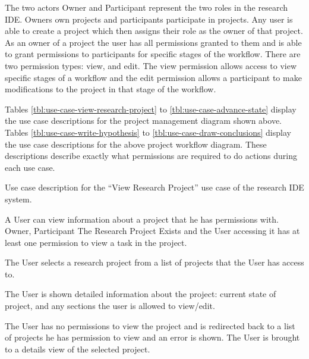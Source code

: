 \documentclass[document.tex]{subfiles}
\begin{document}
\FloatBarrier

  The two actors Owner and Participant represent the two roles in the research IDE. Owners own projects and participants participate in projects. Any user is able to create a project which then assigns their role as the owner of that project. As an owner of a project the user has all permissions granted to them and is able to grant permissions to participants for specific stages of the workflow. There are two permission types: view, and edit. The view permission allows access to view specific stages of a workflow and the edit permission allows a participant to make modifications to the project in that stage of the workflow.

  Tables \ref{tbl:use-case-view-research-project} to \ref{tbl:use-case-advance-state} display the use case descriptions for the project management diagram shown above. Tables \ref{tbl:use-case-write-hypothesis} to \ref{tbl:use-case-draw-conclusions} display the use case descriptions for the above project workflow diagram. These descriptions describe exactly what permissions are required to do actions during each use case.
 
\begin{table}
  \centering
  \caption{Use case description for the ``View Research Project'' use case of the research IDE system.}
  \label{tbl:use-case-view-research-project}

  \begin{usecase}
    A User can view information about a project that he has permissions with.
    Owner, Participant
    The Research Project Exists and the User accessing it has at least one permission to view a task in the project.
    \ucnormal
    \begin{ucenum}
      \item The User selects a research project from a list of projects that the User has access to.
      \item The User is shown detailed information about the project: current state of project, and any sections the user is allowed to view/edit.
    \end{ucenum}
    The User has no permissions to view the project and is redirected back to a list of projects he has permission to view and an error is shown.
    The User is brought to a details view of the selected project.
  \end{usecase}
\end{table}
\end{document}
